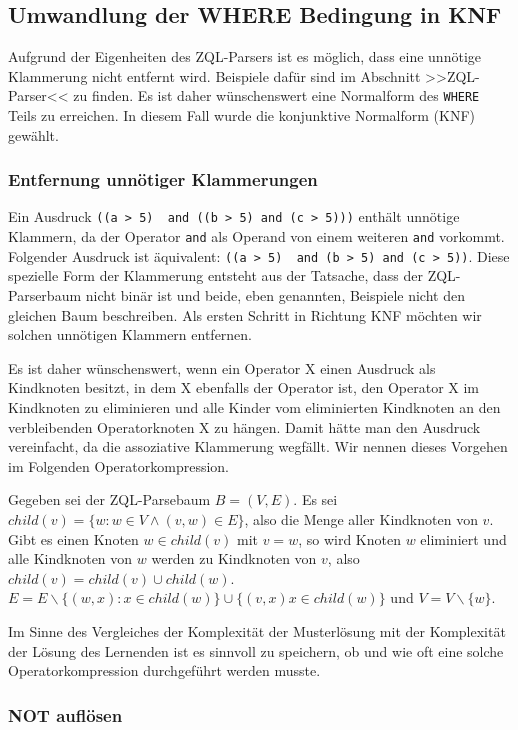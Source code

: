 \subsection{Umwandlung der WHERE Bedingung in KNF}

Aufgrund der Eigenheiten des ZQL-Parsers ist es möglich, dass eine unnötige Klammerung nicht entfernt wird. Beispiele dafür sind im Abschnitt >>ZQL-Parser<< zu finden. Es ist daher wünschenswert eine Normalform des \verb|WHERE| Teils zu erreichen. In diesem Fall wurde die konjunktive Normalform (KNF) gewählt.


\subsubsection{Entfernung unnötiger Klammerungen}

Ein Ausdruck \verb|((a > 5)  and ((b > 5) and (c > 5)))| enthält unnötige Klammern, da der Operator \verb|and| als Operand von einem weiteren \verb|and| vorkommt. Folgender Ausdruck ist äquivalent: \verb|((a > 5)  and (b > 5) and (c > 5))|. Diese spezielle Form der Klammerung entsteht aus der Tatsache, dass der ZQL-Parserbaum nicht binär ist und beide,  eben genannten, Beispiele nicht den gleichen Baum beschreiben. Als ersten Schritt in Richtung KNF möchten wir solchen unnötigen Klammern entfernen. 

Es ist daher wünschenswert, wenn ein Operator X einen Ausdruck als Kindknoten besitzt, in dem X ebenfalls der Operator ist, den Operator X im Kindknoten zu eliminieren und alle Kinder vom eliminierten Kindknoten an den verbleibenden Operatorknoten X zu hängen. Damit hätte man den Ausdruck vereinfacht, da die assoziative Klammerung wegfällt. Wir nennen dieses Vorgehen im Folgenden Operatorkompression.

Gegeben sei der ZQL-Parsebaum $B=(V,E)$. Es sei $child(v) = \{ w : w\in V \wedge (v,w)\in E\}$, also die Menge aller Kindknoten von $v$. Gibt es einen Knoten $w\in child(v)$ mit $v=w$, so wird Knoten $w$ eliminiert und alle Kindknoten von $w$ werden zu Kindknoten von $v$, also $child(v) = child(v) \cup child(w)$. 
$E=E\backslash \{ (w,x) : x\in child(w)\} \cup \{(v,x) x\in child(w)\}$ und $V=V\backslash \{w\}$.

Im Sinne des Vergleiches der Komplexität der Musterlösung mit der Komplexität der Lösung des Lernenden ist es sinnvoll zu speichern, ob und wie oft eine solche Operatorkompression durchgeführt werden musste.

\subsubsection{NOT auflösen}


